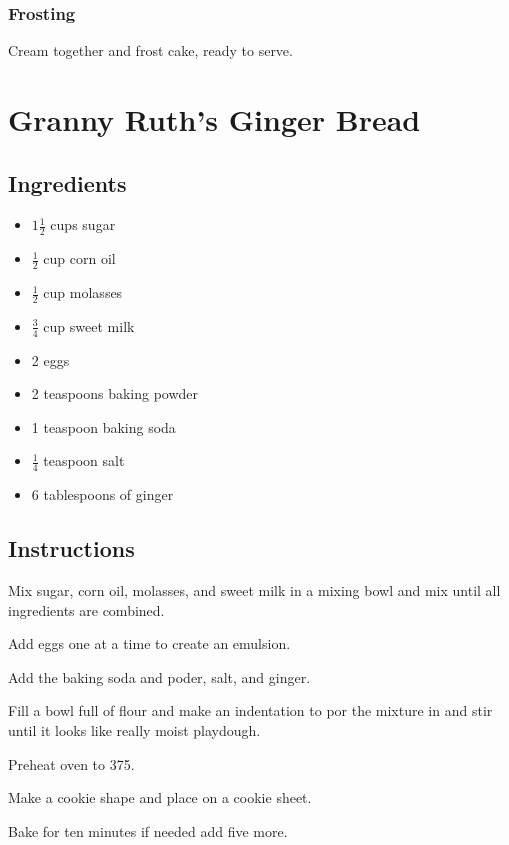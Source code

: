 \documentclass{book}
\begin{document}
\subsubsection{Frosting}
\begin{numerize}
\item
Cream together and frost cake, ready to serve.
\end{numerize}
\newpage
{}
\section*{Granny Ruth's Ginger Bread}
\subsection*{Ingredients}
\begin{itemize}
\item
$1\frac{1}{2}$ cups sugar
\item
$\frac{1}{2}$ cup corn oil
\item
$\frac{1}{2}$ cup molasses
\item
$\frac{3}{4}$ cup sweet milk
\item
2 eggs
\item
2 teaspoons baking powder
\item
1 teaspoon baking soda
\item
$\frac{1}{4}$ teaspoon salt
\item
6 tablespoons of ginger
\end{itemize}
\subsection*{Instructions}
\begin{numerize}
\item
Mix sugar, corn oil, molasses, and sweet milk in a mixing bowl and mix until all ingredients are combined.
\item
Add eggs one at a time to create an emulsion.
\item
Add the baking soda and poder, salt, and ginger.
\item
Fill a bowl full of flour and make an indentation to por the mixture in and stir until it looks like really moist playdough.
\item
Preheat oven to 375.
\item
Make a cookie shape and place on a cookie sheet.
\item
Bake for ten minutes if needed add five more.
\end{numerize}
\newpage
{}
\end{document}
